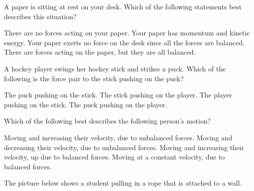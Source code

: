 \documentclass[answers]{exam}
\begin{document}
\begin{questions}
\question 
A paper is sitting at rest on your desk.  Which of the following statements best describes this situation?

\begin{randomizechoices}[norandomize]
    \choice There are no forces acting on your paper.
    \choice Your paper has momentum and kinetic energy.
    \choice Your paper exerts no force on the desk since all the forces are balanced.
    \correctchoice There are forces acting on the paper, but they are all balanced.
\end{randomizechoices}

\question
A hockey player swings her hockey stick and strikes a puck.  Which of the following is the force pair to the stick pushing on the puck?

\begin{randomizechoices}[norandomize]
    \correctchoice The puck pushing on the stick.
    \choice The stick pushing on the player.
    \choice The player pushing on the stick.
    \choice The puck pushing on the player.
\end{randomizechoices}


\question 
Which of the following best describes the following person's motion?


\begin{center}
\end{center}

\begin{randomizechoices}[norandomize]
    \choice Moving and increasing their velocity, due to unbalanced forces.
    \choice Moving and decreasing their velocity, due to unbalanced forces.
    \choice Moving and increasing their velocity, up due to balanced forces.
    \correctchoice Moving at a constant velocity, due to balanced forces.
\end{randomizechoices}

\question 
The picture below shows a student pulling in a rope that is attached to a wall.

\begin{center}
\end{center}


\end{questions}
\end{document}

